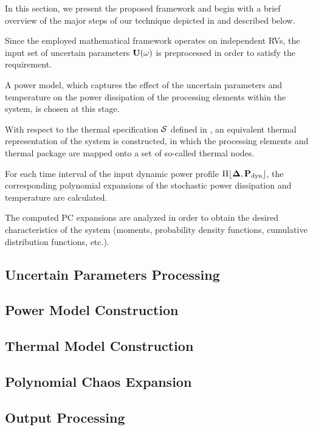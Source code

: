 In this section, we present the proposed framework and begin with a brief overview of the major steps of our technique depicted in  and described below.

 Since the employed mathematical framework operates on independent RVs, the input set of uncertain parameters $\mathbf{U}(\omega)$ is preprocessed in order to satisfy the requirement.

 A power model, which captures the effect of the uncertain parameters and temperature on the power dissipation of the processing elements within the system, is chosen at this stage.

 With respect to the thermal specification $\mathcal{S}$ defined in , an equivalent thermal representation of the system is constructed, in which the processing elements and thermal package are mapped onto a set of so-called thermal nodes.

 For each time interval of the input dynamic power profile $\profPdyn$, the corresponding polynomial expansions of the stochastic power dissipation and temperature are calculated.

 The computed PC expansions are analyzed in order to obtain the desired characteristics of the system (moments, probability density functions, cumulative distribution functions, etc.).

\subsection{Uncertain Parameters Processing} 


\subsection{Power Model Construction} 


\subsection{Thermal Model Construction} 


\subsection{Polynomial Chaos Expansion} 


\subsection{Output Processing} 

